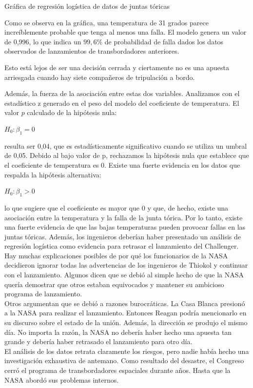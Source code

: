 Gráfica de regresión logística de datos de juntas tóricas 

Como se observa en la gráfica, una temperatura de 31 grados parece
increíblemente probable que tenga al menos una falla. El modelo genera un valor
de 0,996, lo que indica un $99,6 \%$ de probabilidad de falla dados los datos
observados de lanzamientos de transbordadores anteriores.

Esto está lejos de ser una decisión cerrada y ciertamente no es una apuesta
arriesgada cuando hay siete compañeros de tripulación a bordo.

Además, la fuerza de la asociación entre estas dos variables. Analizamos con el
estadístico z generado en el peso del modelo del coeficiente de temperatura. El
valor $p$ calculado de la hipótesis nula:


\begin{center}  
$H_0 : \beta_1 = 0$
\end{center}


resulta ser 0,04, que es estadísticamente significativo cuando se utiliza un
umbral de 0,05. Debido al bajo valor de p, rechazamos la hipótesis nula que
establece que el coeficiente de temperatura es 0. Existe una fuerte evidencia en
los datos que respalda la hipótesis alternativa:

\begin{center}  
$H_0 : \beta_1 > 0$
\end{center}


lo que sugiere que el coeficiente es mayor que 0 y que, de hecho, existe una
asociación entre la temperatura y la falla de la junta tórica. Por lo tanto,
existe una fuerte evidencia de que las bajas temperaturas pueden provocar fallas
en las juntas tóricas. Además, los ingenieros deberían haber presentado un
análisis de regresión logística como evidencia para retrasar el lanzamiento del
Challenger.\\

Hay muchas explicaciones posibles de por qué los funcionarios de la NASA
decidieron ignorar todas las advertencias de los ingenieros de Thiokol y
continuar con el lanzamiento. Algunos dicen que se debió al simple hecho de que
la NASA quería demostrar que otros estaban equivocados y mantener su ambicioso
programa de lanzamiento.\\

Otros argumentan que se debió a razones burocráticas. La Casa Blanca presionó a
la NASA para realizar el lanzamiento. Entonces Reagan podría mencionarlo en su
discurso sobre el estado de la unión. Además, la dirección se produjo el mismo
día. No importa la razón, la NASA no debería haber hecho una apuesta tan grande
y debería haber retrasado el lanzamiento para otro día.\\
El análisis de los datos retrata claramente los riesgos, pero nadie había hecho
una investigación exhaustiva de antemano. Como resultado del desastre, el
Congreso cerró el programa de transbordadores espaciales durante años. Hasta que
la NASA abordó sus problemas internos.\\

